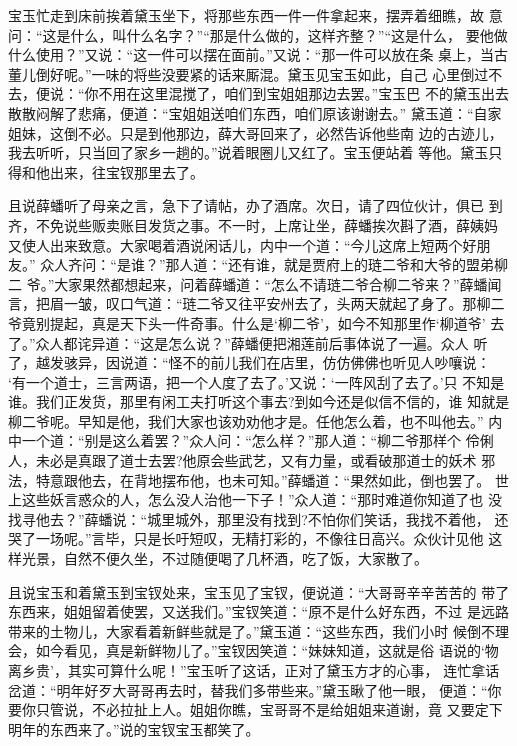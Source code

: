 宝玉忙走到床前挨着黛玉坐下，将那些东西一件一件拿起来，摆弄着细瞧，故
意问：“这是什么，叫什么名字？”“那是什么做的，这样齐整？”“这是什么，
要他做什么使用？”又说：“这一件可以摆在面前。”又说：“那一件可以放在条
桌上，当古董儿倒好呢。”一味的将些没要紧的话来厮混。黛玉见宝玉如此，自己
心里倒过不去，便说：“你不用在这里混搅了，咱们到宝姐姐那边去罢。”宝玉巴
不的黛玉出去散散闷解了悲痛，便道：“宝姐姐送咱们东西，咱们原该谢谢去。”
黛玉道：“自家姐妹，这倒不必。只是到他那边，薛大哥回来了，必然告诉他些南
边的古迹儿，我去听听，只当回了家乡一趟的。”说着眼圈儿又红了。宝玉便站着
等他。黛玉只得和他出来，往宝钗那里去了。

且说薛蟠听了母亲之言，急下了请帖，办了酒席。次日，请了四位伙计，俱已
到齐，不免说些贩卖账目发货之事。不一时，上席让坐，薛蟠挨次斟了酒，薛姨妈
又使人出来致意。大家喝着酒说闲话儿，内中一个道：“今儿这席上短两个好朋友。”
众人齐问：“是谁？”那人道：“还有谁，就是贾府上的琏二爷和大爷的盟弟柳二
爷。”大家果然都想起来，问着薛蟠道：“怎么不请琏二爷合柳二爷来？”薛蟠闻
言，把眉一皱，叹口气道：“琏二爷又往平安州去了，头两天就起了身了。那柳二
爷竟别提起，真是天下头一件奇事。什么是‘柳二爷’，如今不知那里作‘柳道爷’
去了。”众人都诧异道：“这是怎么说？”薛蟠便把湘莲前后事体说了一遍。众人
听了，越发骇异，因说道：“怪不的前儿我们在店里，仿仿佛佛也听见人吵嚷说：
‘有一个道士，三言两语，把一个人度了去了。’又说：‘一阵风刮了去了。’只
不知是谁。我们正发货，那里有闲工夫打听这个事去?到如今还是似信不信的，谁
知就是柳二爷呢。早知是他，我们大家也该劝劝他才是。任他怎么着，也不叫他去。”
内中一个道：“别是这么着罢？”众人问：“怎么样？”那人道：“柳二爷那样个
伶俐人，未必是真跟了道士去罢?他原会些武艺，又有力量，或看破那道士的妖术
邪法，特意跟他去，在背地摆布他，也未可知。”薛蟠道：“果然如此，倒也罢了。
世上这些妖言惑众的人，怎么没人治他一下子！”众人道：“那时难道你知道了也
没找寻他去？”薛蟠说：“城里城外，那里没有找到?不怕你们笑话，我找不着他，
还哭了一场呢。”言毕，只是长吁短叹，无精打彩的，不像往日高兴。众伙计见他
这样光景，自然不便久坐，不过随便喝了几杯酒，吃了饭，大家散了。

且说宝玉和着黛玉到宝钗处来，宝玉见了宝钗，便说道：“大哥哥辛辛苦苦的
带了东西来，姐姐留着使罢，又送我们。”宝钗笑道：“原不是什么好东西，不过
是远路带来的土物儿，大家看着新鲜些就是了。”黛玉道：“这些东西，我们小时
候倒不理会，如今看见，真是新鲜物儿了。”宝钗因笑道：“妹妹知道，这就是俗
语说的‘物离乡贵’，其实可算什么呢！”宝玉听了这话，正对了黛玉方才的心事，
连忙拿话岔道：“明年好歹大哥哥再去时，替我们多带些来。”黛玉瞅了他一眼，
便道：“你要你只管说，不必拉扯上人。姐姐你瞧，宝哥哥不是给姐姐来道谢，竟
又要定下明年的东西来了。”说的宝钗宝玉都笑了。

